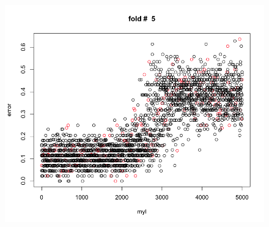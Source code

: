 \documentclass[11pt]{article}
\begin{document}
\begin{enumerate}
\begin{figure}[H]
\begin{center}
{\begin{centering}
\includegraphics[scale=0.225]{pix/f5}
\par\end{centering}}
\quad{}
\end{center}
\end{figure}


\end{enumerate}
\end{document}

